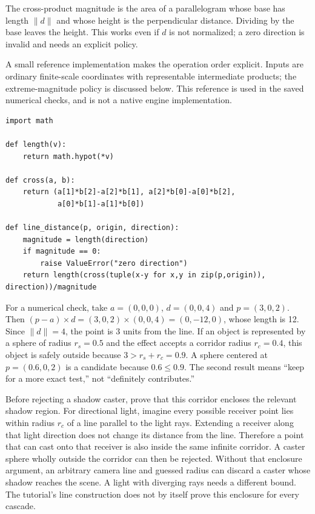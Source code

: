The cross-product magnitude is the area of a parallelogram whose base has length \(\|d\|\) and whose height is the perpendicular distance. Dividing by the base leaves the height. This works even if \(d\) is not normalized; a zero direction is invalid and needs an explicit policy.

A small reference implementation makes the operation order explicit. Inputs are ordinary finite-scale coordinates with representable intermediate products; the extreme-magnitude policy is discussed below. This reference is used in the saved numerical checks, and is not a native engine implementation.

\begin{verbatim}
import math

def length(v):
    return math.hypot(*v)

def cross(a, b):
    return (a[1]*b[2]-a[2]*b[1], a[2]*b[0]-a[0]*b[2],
            a[0]*b[1]-a[1]*b[0])

def line_distance(p, origin, direction):
    magnitude = length(direction)
    if magnitude == 0:
        raise ValueError("zero direction")
    return length(cross(tuple(x-y for x,y in zip(p,origin)), direction))/magnitude
\end{verbatim}

For a numerical check, take \(a=(0,0,0)\), \(d=(0,0,4)\) and \(p=(3,0,2)\). Then \((p-a)\times d=(3,0,2)\times(0,0,4)=(0,-12,0)\), whose length is 12. Since \(\|d\|=4\), the point is 3 units from the line. If an object is represented by a sphere of radius \(r_s=0.5\) and the effect accepts a corridor radius \(r_c=0.4\), this object is safely outside because \(3>r_s+r_c=0.9\). A sphere centered at \(p=(0.6,0,2)\) is a candidate because \(0.6\leq0.9\). The second result means ``keep for a more exact test,'' not ``definitely contributes.''

Before rejecting a shadow caster, prove that this corridor encloses the relevant shadow region. For directional light, imagine every possible receiver point lies within radius \(r_c\) of a line parallel to the light rays. Extending a receiver along that light direction does not change its distance from the line. Therefore a point that can cast onto that receiver is also inside the same infinite corridor. A caster sphere wholly outside the corridor can then be rejected. Without that enclosure argument, an arbitrary camera line and guessed radius can discard a caster whose shadow reaches the scene. A light with diverging rays needs a different bound. The tutorial's line construction does not by itself prove this enclosure for every cascade.

